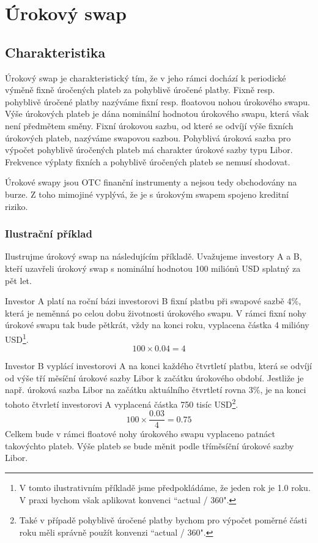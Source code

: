 \documentclass[a4paper]{book}
\begin{document}
\section{Úrokový swap}

\subsection{Charakteristika}

Úrokový swap je charakteristický tím, že v jeho rámci dochází k periodické výměně fixně úročených plateb za pohyblivě úročené platby. Fixně resp. pohyblivě úročené platby nazýváme fixní resp. floatovou nohou úrokového swapu. Výše úrokových plateb je dána nominální hodnotou úrokového swapu, která však není předmětem směny. Fixní úrokovou sazbu, od které se odvíjí výše fixních úrokových plateb, nazýváme swapovou sazbou. Pohyblivá úroková sazba pro výpočet pohyblivě úročených plateb má charakter úrokové sazby typu Libor. Frekvence výplaty fixních a pohyblivě úročených plateb se nemusí shodovat.

Úrokové swapy jsou OTC finanční instrumenty a nejsou tedy obchodovány na burze. Z toho mimojiné vyplývá, že je s úrokovým swapem spojeno kreditní riziko.

\subsubsection{Ilustrační příklad}

Ilustrujme úrokový swap na následujícím příkladě. Uvažujeme investory A a B, kteří uzavřeli úrokový swap s nominální hodnotou 100 miliónů USD splatný za pět let.

Investor A platí na roční bázi investorovi B fixní platbu při swapové sazbě 4\%, která je neměnná po celou dobu životnosti úrokového swapu. V rámci fixní nohy úrokové swapu tak bude pětkrát, vždy na konci roku, vyplacena částka 4 milióny USD\footnote{V tomto ilustrativním příkladě jsme předpokládáme, že jeden rok je 1.0 roku. V praxi bychom však aplikovat konvenci ``actual / 360".}.
\begin{equation*}
100 \times 0.04 = 4
\end{equation*}

Investor B vyplácí investorovi A na konci každého čtvrtletí platbu, která se odvíjí od výše tří měsíční úrokové sazby Libor k začátku úrokového období. Jestliže je např. úroková sazba Libor na začátku aktuálního čtvrtletí rovna 3\%, je na konci tohoto čtvrletí investorovi A vyplacená částka 750 tisíc USD\footnote{Také v případě pohyblivě úročené platby bychom pro výpočet poměrné části roku měli správně použít konvenzi ``actual / 360".}.
 \begin{equation*}
100 \times \frac{0.03}{4} = 0.75
\end{equation*}
Celkem bude v rámci floatové nohy úrokového swapu vyplaceno patnáct takovýchto plateb. Výše plateb se bude měnit podle tříměsíční úrokové sazby Libor.
\end{document}
